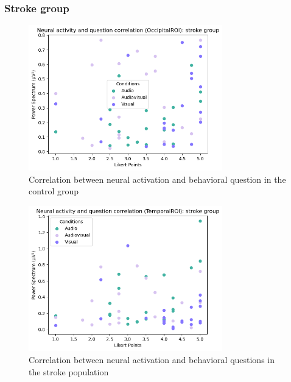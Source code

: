 \subsubsection*{Stroke group}
\begin{figure}[H]
    \centering
    \includegraphics[width=0.75\textwidth]{scatter_plots/s_occipital_q2.png}
    \caption{Correlation between neural activation and behavioral question in the control group}
    \label{fig: correlation q2 occipitalROI: stroke group} 
\end{figure}
\begin{figure}[H]
    \centering
    \includegraphics[width=0.75\textwidth]{scatter_plots/s_temporal_q2.png}
    \caption{Correlation between neural activation and behavioral questions in the stroke population}
    \label{fig: correlation q2 temporalROI: stroke group} 
\end{figure}
